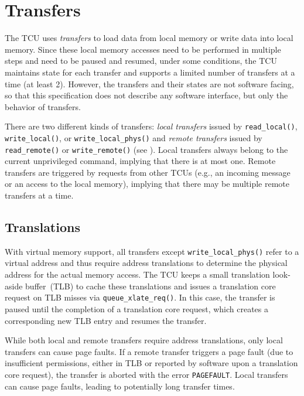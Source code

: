 \chapter{Transfers}

The TCU uses \emph{transfers} to load data from local memory or write data into local memory. Since
these local memory accesses need to be performed in multiple steps and need to be paused and
resumed\colorbox{vm}{, under some conditions,} the TCU maintains state for each transfer and
supports a limited number of transfers at a time (at least 2). However, the transfers and their
states are not software facing, so that this specification does not describe any software interface,
but only the behavior of transfers.

There are two different kinds of transfers: \emph{local transfers} issued by \texttt{read\_local()},
\texttt{write\_local()}, or \texttt{write\_local\_phys()} and \emph{remote transfers} issued by
\texttt{read\_remote()} or \texttt{write\_remote()} (see ). Local
transfers always belong to the current unprivileged command, implying that there is at most one.
Remote transfers are triggered by requests from other TCUs (e.g., an incoming message or an access
to the local memory), implying that there may be multiple remote transfers at a time.

\section{Translations}
\label{sec:xlates}

With virtual memory support, all transfers except \texttt{write\_local\_phys()} refer to a virtual
address and thus require address translations to determine the physical address for the actual
memory access. The TCU keeps a small translation look-aside buffer~(TLB) to cache these translations
and issues a translation core request on TLB misses via \texttt{queue\_xlate\_req()}. In this case,
the transfer is paused until the completion of a translation core request, which creates a
corresponding new TLB entry and resumes the transfer.

While both local and remote transfers require address translations, only local transfers can cause
page faults. If a remote transfer triggers a page fault (due to insufficient permissions, either in
TLB or reported by software upon a translation core request), the transfer is aborted with the error
\texttt{PAGEFAULT}. Local transfers can cause page faults, leading to potentially long transfer
times.

